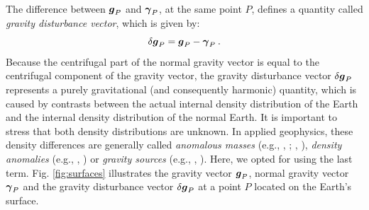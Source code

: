 \documentclass[extra]{gji}
\begin{document}
The difference between $\mitbf{g}_{P}$ and $\mitbf{\gamma}_{P}$, at the same 
point $P$, defines a quantity called \textit{gravity disturbance 
vector}, which is given by:
\begin{equation}
\delta \mitbf{g}_{P} = 
\mitbf{g}_{P} - \mitbf{\gamma}_{P} \: .
\label{eq:gravity-disturbance-vector}
\end{equation}
Because the centrifugal part of the normal gravity vector 
is equal to the centrifugal component of the gravity vector, 
the gravity disturbance vector $\delta \mitbf{g}_{P}$ represents 
a purely gravitational (and consequently harmonic) quantity, which is 
caused by contrasts between the actual internal 
density distribution of the Earth and the internal density 
distribution of the normal Earth.
It is important to stress that both density distributions are unknown.
In applied geophysics, these density differences are generally 
called \textit{anomalous masses} (e.g., \citeauthor{hammer1945}, 
\citeyear{hammer1945}; \citeauthor{lafehr1965}, \citeyear{lafehr1965}),
\textit{density anomalies} (e.g., \citeauthor{forsberg1984}, 
\citeyear{forsberg1984}) or \textit{gravity sources} (e.g., 
\citeauthor{blakely1996}, \citeyear{blakely1996}). Here, we opted for 
using the last term.
Fig. \ref{fig:surfaces} illustrates the gravity vector 
$\mitbf{g}_{P}$, normal gravity vector $\mitbf{\gamma}_{P}$ and 
the gravity disturbance vector $\delta \mitbf{g}_{P}$ at a point $P$ 
located on the Earth's surface.
\end{document}
